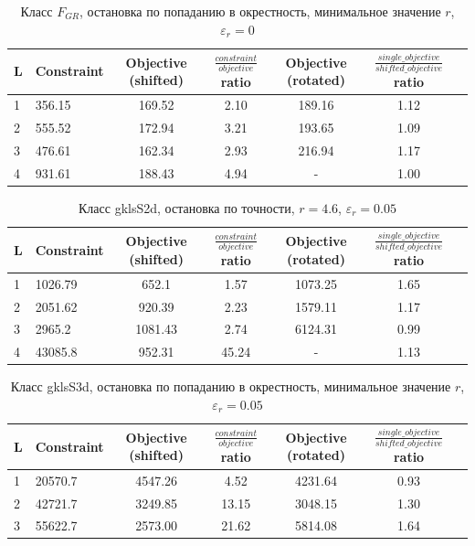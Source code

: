 \documentclass[a4paper]{article}
\begin{document}
\begin{table}[H]
\begin{center}
\caption{Класс $F_{GR}$, остановка по попаданию в окрестность, минимальное значение $r$, $\varepsilon_r=0$}
  \begin{tabular}{l|l*{5}{c}}
  L & Constraint & Objective (shifted) & $\frac{constraint}{objective}$ ratio & Objective (rotated) & $\frac{single\_objective}{shifted\_objective}$ ratio \\
  \hline
  1 & 356.15 & 169.52 & 2.10 & 189.16 & 1.12 \\
  2 & 555.52 & 172.94 & 3.21 & 193.65 & 1.09 \\
  3 & 476.61 & 162.34 & 2.93 & 216.94 & 1.17 \\
  4 & 931.61 & 188.43 & 4.94 &  -     & 1.00 \\
  \end{tabular}
\end{center}
\end{table}

\begin{table}[H]
\begin{center}
\caption{Класс gklsS2d, остановка по точности, $r=4.6$, $\varepsilon_r=0.05$}
  \begin{tabular}{l|l*{5}{c}}
  L & Constraint & Objective (shifted) & $\frac{constraint}{objective}$ ratio & Objective (rotated) & $\frac{single\_objective}{shifted\_objective}$ ratio \\
  \hline
  1 & 1026.79 & 652.1   & 1.57  & 1073.25 & 1.65 \\
  2 & 2051.62 & 920.39  & 2.23  & 1579.11 & 1.17 \\
  3 & 2965.2  & 1081.43 & 2.74  & 6124.31 & 0.99 \\
  4 & 43085.8 & 952.31  & 45.24 & -       & 1.13 \\
  \end{tabular}
\end{center}
\end{table}

\begin{table}[H]
\begin{center}
\caption{Класс gklsS3d, остановка по попаданию в окрестность, минимальное значение $r$, $\varepsilon_r=0.05$}
  \begin{tabular}{l|l*{5}{c}}
  L & Constraint & Objective (shifted) & $\frac{constraint}{objective}$ ratio & Objective (rotated) & $\frac{single\_objective}{shifted\_objective}$ ratio \\
  \hline
  1 & 20570.7  & 4547.26 &  4.52 & 4231.64 & 0.93 \\
  2 & 42721.7  & 3249.85 & 13.15 & 3048.15 & 1.30 \\
  3 & 55622.7  & 2573.00 & 21.62 & 5814.08 & 1.64 \\
  \end{tabular}
\end{center}
\end{table}
\end{document}
